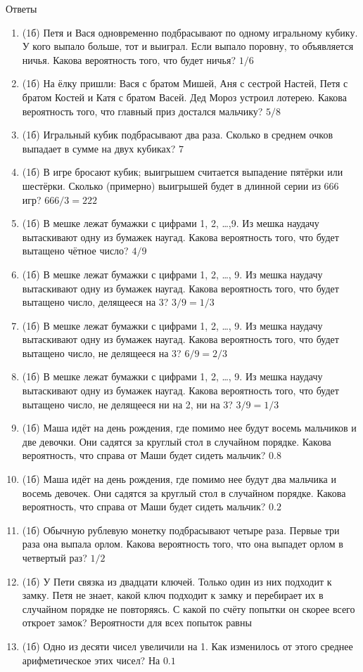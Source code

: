 \documentclass[a4paper, 12pt]{article}
\begin{document}
\newpage
Ответы
\begin{enumerate}
\item (1б) Петя и Вася одновременно подбрасывают по одному игральному кубику. У кого выпало больше, тот и выиграл. Если выпало поровну, то объявляется ничья. Какова вероятность того, что будет ничья? $1/6$
\item (1б) На ёлку пришли: Вася с братом Мишей, Аня с сестрой Настей, Петя с братом Костей и Катя с братом Васей. Дед Мороз устроил лотерею. Какова вероятность того, что главный приз достался мальчику? $5/8$
\item (1б) Игральный кубик подбрасывают два раза. Сколько в среднем очков выпадает в сумме на двух кубиках? $7$
\item (1б) В игре бросают кубик; выигрышем считается выпадение пятёрки или шестёрки. Сколько (примерно) выигрышей будет в длинной серии из 666 игр? $666/3=222$
\item (1б) В мешке лежат бумажки с цифрами 1, 2, \ldots ,9. Из мешка наудачу вытаскивают одну из бумажек наугад. Какова вероятность того, что будет вытащено чётное число? $4/9$
\item (1б) В мешке лежат бумажки с цифрами 1, 2, \ldots, 9. Из мешка наудачу вытаскивают одну из бумажек наугад. Какова вероятность того, что будет вытащено число, делящееся на 3? $3/9=1/3$
\item (1б) В мешке лежат бумажки с цифрами 1, 2, \ldots, 9. Из мешка наудачу вытаскивают одну из бумажек наугад. Какова вероятность того, что будет вытащено число, не делящееся на 3? $6/9=2/3$
\item (1б) В мешке лежат бумажки с цифрами 1, 2, \ldots, 9. Из мешка наудачу вытаскивают одну из бумажек наугад. Какова вероятность того, что будет вытащено число, не делящееся ни на 2, ни на 3? $3/9=1/3$
\item (1б) Маша идёт на день рождения, где помимо нее будут восемь мальчиков и две девочки. Они садятся за круглый стол в случайном порядке. Какова вероятность, что справа от Маши будет сидеть мальчик? $0.8$
\item (1б) Маша идёт на день рождения, где помимо нее будут два мальчика и восемь девочек. Они садятся за круглый стол в случайном порядке. Какова вероятность, что справа от Маши будет сидеть мальчик? $0.2$
\item (1б) Обычную рублевую монетку подбрасывают четыре раза. Первые три раза она выпала орлом. Какова вероятность того, что она выпадет орлом в четвертый раз? $1/2$
\item (1б) У Пети связка из двадцати ключей. Только один из них подходит к замку. Петя не знает, какой ключ подходит к замку и перебирает их в случайном порядке не повторяясь. 
С какой по счёту попытки он скорее всего откроет замок? Вероятности для всех попыток равны
\item (1б) Одно из десяти чисел увеличили на 1. Как изменилось от этого среднее арифметическое этих чисел? На $0.1$
\end{enumerate}
\end{document}
